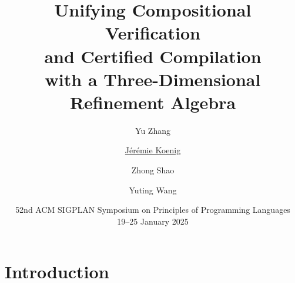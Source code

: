 \documentclass[aspectratio=1610,mathserif]{beamer}
\title[Unifying \ldots with 3D Refinement]{%
  Unifying Compositional Verification \\
  and Certified Compilation \\
  with a Three-Dimensional Refinement Algebra
}
\author[Zhang \and Koenig \and Shao \and Wang]{%
  Yu Zhang\inst1 \and
  \underline{J\'er\'emie Koenig}\inst1 \and
  Zhong Shao\inst1 \and
  Yuting Wang\inst2
}
\institute[Yale, SJTU]{%
  \inst1 Yale University \and
  \inst2 Shanghai Jiao Tong University
}
\date[POPL 2025]{%
  52nd ACM SIGPLAN Symposium
  on Principles of Programming Languages \\
  19--25 January 2025
}
\begin{document}
\maketitle

\section{Introduction}

%
\end{document}
